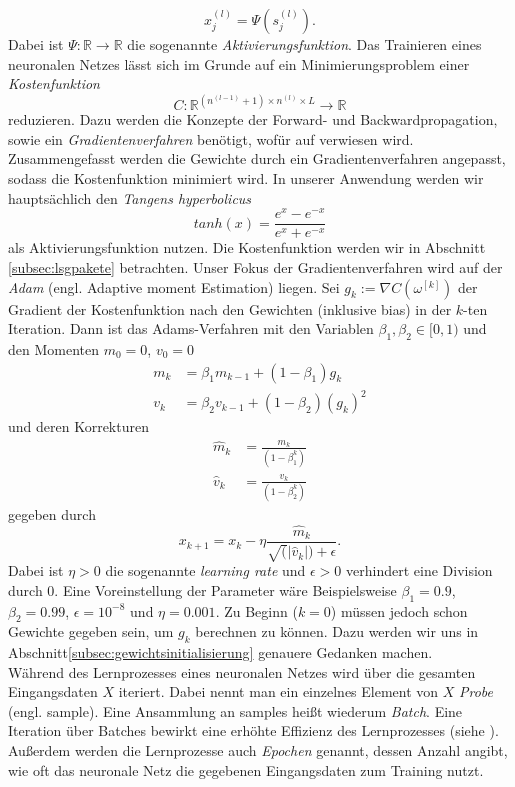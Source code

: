 \[
    x_j^{(l)}=\Psi(s_j^{(l)}).
\]
Dabei ist $\Psi: \mathbb{R} \rightarrow \mathbb{R}$ die sogenannte \textit{Aktivierungsfunktion}. Das Trainieren eines
neuronalen Netzes lässt sich im Grunde auf ein Minimierungsproblem einer \textit{Kostenfunktion}
\[
    C: \mathbb{R}^{\left(n^{(l-1)} + 1\right) \times n^{(l)} \times L} \rightarrow \mathbb{R}
\]
reduzieren. Dazu werden die Konzepte der Forward- und Backwardpropagation, sowie ein \textit{Gradientenverfahren}
benötigt, wofür auf \cite[6.2.6]{ovidiucalinDeepLearningArchitectures} verwiesen wird. Zusammengefasst werden die
Gewichte durch ein Gradientenverfahren angepasst, sodass die Kostenfunktion minimiert wird. In unserer Anwendung werden
wir hauptsächlich den \textit{Tangens hyperbolicus}
\[
    tanh(x)=\frac{e^x - e^{-x}}{e^x + e^{-x}}
\]
als Aktivierungsfunktion nutzen. Die Kostenfunktion werden wir in Abschnitt \eqref{subsec:lsgpakete} betrachten. Unser
Fokus der Gradientenverfahren wird auf der \textit{Adam} (engl. Adaptive moment Estimation) liegen. Sei
$g_k := \nabla C(\omega^{[k]})$ der Gradient der Kostenfunktion nach den Gewichten (inklusive bias) in der $k$-ten
Iteration. Dann ist das Adams-Verfahren mit den Variablen $\beta_1,\beta_2 \in [0,1)$ und den Momenten $m_{0}=0$,
$v_{0}=0$
\begin{align*}
    m_{k} &= \beta_1 m_{k-1} + (1-\beta_1)g_k \\
    v_{k} &= \beta_2 v_{k-1} + (1-\beta_2)(g_k)^2
\end{align*}
und deren Korrekturen
\begin{align*}
    \hat{m}_{k} &= \frac{m_{k}}{(1-\beta_1^k)} \\
    \hat{v}_{k} &= \frac{v_{k}}{(1-\beta_2^k)}
\end{align*}
gegeben durch
\[
    x_{k+1}= x_{k} - \eta \frac{\hat{m}_{k}}{\sqrt(|\hat{v}_{k}|) + \epsilon}.
\]
Dabei ist $\eta > 0$ die sogenannte \textit{learning rate} und $\epsilon > 0$ verhindert eine Division durch $0$. Eine
Voreinstellung der Parameter wäre Beispielsweise $\beta_1=0.9$, $\beta_2=0.99$, $\epsilon=10^{-8}$ und $\eta = 0.001$.
Zu Beginn ($k=0$) müssen jedoch schon Gewichte gegeben sein, um $g_k$ berechnen zu können. Dazu werden wir uns in
Abschnitt\eqref{subsec:gewichtsinitialisierung} genauere Gedanken machen.\\
Während des Lernprozesses eines neuronalen Netzes wird über die gesamten Eingangsdaten $X$ iteriert. Dabei nennt man ein
einzelnes Element von $X$ \textit{Probe} (engl. sample). Eine Ansammlung an samples heißt wiederum \textit{Batch}. Eine
Iteration über Batches bewirkt eine erhöhte Effizienz des Lernprozesses
(siehe \cite[6.2.8]{ovidiucalinDeepLearningArchitectures}). Außerdem werden die Lernprozesse auch \textit{Epochen}
genannt, dessen Anzahl angibt, wie oft das neuronale Netz die gegebenen Eingangsdaten zum Training nutzt.

